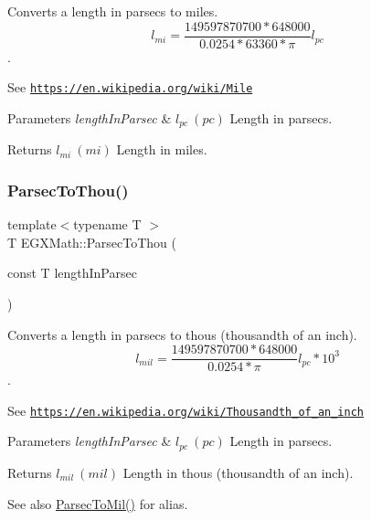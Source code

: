 Converts a length in parsecs to miles. \[ l_{mi}=\frac{149597870700 * 648000}{ 0.0254 * 63360 * \pi} l_{pc} \]. 

See \href{https://en.wikipedia.org/wiki/Mile}{\tt https\+://en.\+wikipedia.\+org/wiki/\+Mile} 
\begin{DoxyParams}{Parameters}
{\em length\+In\+Parsec} & $ l_{pc}\ (pc)$ Length in parsecs. \\
\hline
\end{DoxyParams}
\begin{DoxyReturn}{Returns}
$ l_{mi}\ (mi)$ Length in miles. 
\end{DoxyReturn}
\mbox{\label{group___e_g_x_math-_conversions-_length_conversions-_astronomical-_parsec-_imperial_ga0e473cc0d93ca332b9fc42ed6f8d73c6}} 
\subsubsection{\texorpdfstring{Parsec\+To\+Thou()}{ParsecToThou()}}
{\footnotesize\ttfamily template$<$typename T $>$ \\
T E\+G\+X\+Math\+::\+Parsec\+To\+Thou (\begin{DoxyParamCaption}\item[{const T}]{length\+In\+Parsec }\end{DoxyParamCaption})}



Converts a length in parsecs to thous (thousandth of an inch). \[ l_{mil}= \frac{149597870700 * 648000}{0.0254 * \pi} l_{pc} * 10^{3} \]. 

See \href{https://en.wikipedia.org/wiki/Thousandth_of_an_inch}{\tt https\+://en.\+wikipedia.\+org/wiki/\+Thousandth\+\_\+of\+\_\+an\+\_\+inch} 
\begin{DoxyParams}{Parameters}
{\em length\+In\+Parsec} & $ l_{pc}\ (pc)$ Length in parsecs. \\
\hline
\end{DoxyParams}
\begin{DoxyReturn}{Returns}
$ l_{mil}\ (mil)$ Length in thous (thousandth of an inch). 
\end{DoxyReturn}
\begin{DoxySeeAlso}{See also}
\mbox{\hyperlink{group___e_g_x_math-_conversions-_length_conversions-_astronomical-_parsec-_imperial_ga7ff283e88a975e05bd987930e8b3cbf2}{Parsec\+To\+Mil()}} for alias. 
\end{DoxySeeAlso}
\mbox{\label{group___e_g_x_math-_conversions-_length_conversions-_astronomical-_parsec-_imperial_gae9ae73b70979fb012736516147854cf4}} 
